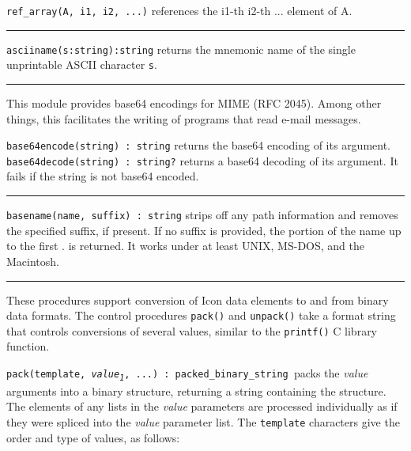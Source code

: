 \texttt{ref\_array(A, i1, i2, ...)} references the i1-th i2-th ...
element of A. 

\vspace{0.25cm}\hrule{}

\texttt{asciiname(s:string):string} returns the mnemonic name of the
single unprintable ASCII character \texttt{s}.

\pagebreak

\vspace{0.25cm}\hrule{}

This module provides base64 encodings for MIME (RFC 2045).
Among other things, this facilitates the writing of programs that read
e-mail messages.

\texttt{base64encode(string) : string} returns the base64 encoding of
its argument.\\
\texttt{base64decode(string) : string?} returns a base64 decoding of its
argument. It fails if the string is not base64 encoded.

\vspace{0.25cm}\hrule{}

\texttt{basename}\texttt{(name, suffix) : string} strips
off any path information and removes the specified suffix, if present.
If no suffix is provided, the portion of the name up to the first
{\textquotedbl}.{\textquotedbl} is returned. It works under at least
UNIX, MS-DOS, and the Macintosh.

\vspace{0.25cm}\hrule{}

These procedures support conversion of Icon data elements
to and from binary data formats. The control procedures \texttt{pack()}
and \texttt{unpack()} take a format string that controls conversions of
several values, similar to the \texttt{printf()} C library function.

\texttt{pack(template,
}\texttt{\textit{value}}\texttt{\textit{\textsubscript{1}}}\texttt{,
...) : packed\_binary\_string}\texttt{ }packs the \textit{value}
arguments into a binary structure, returning a string containing the
structure. The elements of any lists in the \textit{value} parameters
are processed individually as if they were spliced into the
\textit{value} parameter list. The \texttt{template} characters give
the order and type of values, as follows:

